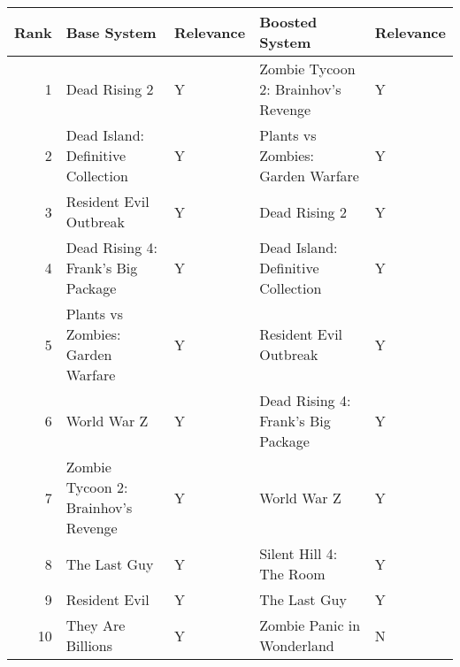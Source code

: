 \begin{tabular}{rllll}
\toprule
 Rank &                         Base System & Relevance &                      Boosted System & Relevance \\
\midrule
    1 &                       Dead Rising 2 &         Y & Zombie Tycoon 2: Brainhov's Revenge &         Y \\
    2 &  Dead Island: Definitive Collection &         Y &   Plants vs Zombies: Garden Warfare &         Y \\
    3 &              Resident Evil Outbreak &         Y &                       Dead Rising 2 &         Y \\
    4 &  Dead Rising 4: Frank's Big Package &         Y &  Dead Island: Definitive Collection &         Y \\
    5 &   Plants vs Zombies: Garden Warfare &         Y &              Resident Evil Outbreak &         Y \\
    6 &                         World War Z &         Y &  Dead Rising 4: Frank's Big Package &         Y \\
    7 & Zombie Tycoon 2: Brainhov's Revenge &         Y &                         World War Z &         Y \\
    8 &                        The Last Guy &         Y &             Silent Hill 4: The Room &         Y \\
    9 &                       Resident Evil &         Y &                        The Last Guy &         Y \\
   10 &                   They Are Billions &         Y &          Zombie Panic in Wonderland &         N \\
\bottomrule
\end{tabular}
